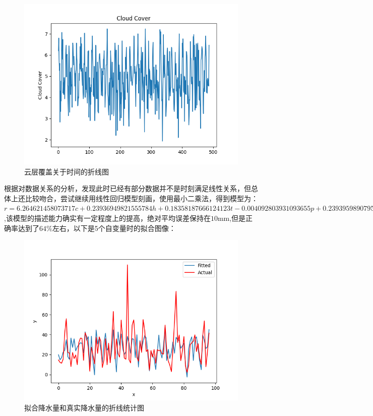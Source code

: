 \documentclass[UTF8, a4paper]{ctexart}
\begin{document}
\clearpage

\begin{figure}[h!]
	\centering
	\includegraphics[scale=0.5]{cc.png}
	\caption{云层覆盖关于时间的折线图}
\end{figure}

根据对数据关系的分析，发现此时已经有部分数据并不是时刻满足线性关系，但总体上还比较吻合，尝试继续用线性回归模型刻画，使用最小二乘法，得到模型为：$r=6.264621458073717c+0.23936949821555784h+0.18358187666124123t-0.004092803931093655p+0.23939598907957882f$,该模型的描述能力确实有一定程度上的提高，绝对平均误差保持在$10$mm,但是正确率达到了$64\%$左右，以下是5个自变量时的拟合图像：

\begin{figure}[h!]
	\centering
	\includegraphics[scale=0.5]{fit2.png}
	\caption{拟合降水量和真实降水量的折线统计图}
\end{figure}
\end{document}
